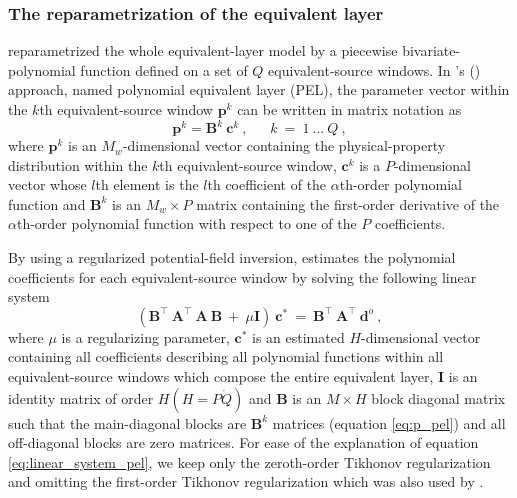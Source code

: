 \subsubsection{The reparametrization of the equivalent layer}

\cite{oliveirajr-etal2013} reparametrized the whole equivalent-layer model by 
a piecewise  bivariate-polynomial function defined on a set of $Q$ equivalent-source windows. 
In \citeauthor{oliveirajr-etal2013}'s (\citeyear{oliveirajr-etal2013}) approach, 
named polynomial equivalent layer (PEL), the parameter vector within the $k$th equivalent-source window 
$\mathbf{p}^{k}$  can be written in matrix notation as  
\begin{equation}
	\mathbf{p}^{k} = \mathbf{B}^{k} \: \mathbf{c}^{k} \:,  \:\:\:\:\:\:\: k \: = \: 1 \:... \: Q \:, 
	\label{eq:p_pel}
\end{equation}
where $\mathbf{p}^{k}$ is an $M_w$-dimensional vector containing the physical-property distribution
within the $k$th equivalent-source window, 
$\mathbf{c}^{k}$ is a $P$-dimensional vector whose $l$th element is the $l$th
coefficient of the $\alpha$th-order polynomial function and
$\mathbf{B}^{k}$ is an $M_w \times P$ matrix containing the first-order derivative of the 
$\alpha$th-order polynomial function with respect to one of the $P$ coefficients.

By using a regularized potential-field inversion, \cite{oliveirajr-etal2013} estimates the polynomial coefficients for each equivalent-source window by solving the following linear system
\begin{equation}
	\left( \mathbf{B}^{\top} \: \mathbf{A}^{\top} \: \mathbf{A} \: \mathbf{B}   \: +
	 \: \mu \mathbf{I} \right) \:  \mathbf{c}^{\ast}
	 \: = \: \mathbf{B}^{\top} \:  \mathbf{A}^{\top} \: \mathbf{d}^{o} \: ,
	\label{eq:linear_system_pel}
\end{equation}
where  $\mu$ is a regularizing parameter, 
$\mathbf{c}^{\ast}$ is an estimated $H$-dimensional vector containing all coefficients describing all polynomial functions within  all equivalent-source windows which compose the entire equivalent layer,
$\mathbf{I}$ is  an identity matrix of order $H (H = P \dot Q) $ and
$\mathbf{B}$ is an $M \times H$  block diagonal matrix such that the main-diagonal blocks 
are $\mathbf{B}^{k}$ matrices (equation \ref{eq:p_pel}) and all off-diagonal blocks are zero matrices.
For ease of the explanation of equation \ref{eq:linear_system_pel}, we keep only the zeroth-order Tikhonov regularization and omitting the first-order Tikhonov regularization \citep{aster2018parameter} 
which was also used  by \cite{oliveirajr-etal2013}.

